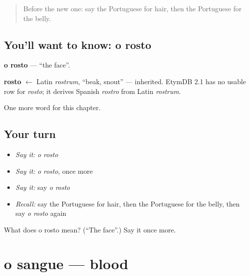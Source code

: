 \label{lesson:PT-C32-rosto}



\begin{quote}
Before the new one: say the Portuguese for hair, then the Portuguese for the belly.
\end{quote}

\subsection*{You'll want to know: o rosto}
\textbf{o rosto} — \textquotedblleft{}the face\textquotedblright{}.

\begin{cousinweb}
\textbf{rosto} $\leftarrow$ Latin \emph{rostrum}, \textquotedblleft{}beak, snout\textquotedblright{} — inherited. EtymDB 2.1 has no usable row for \emph{rosto}; it derives Spanish \emph{rostro} from Latin \emph{rostrum}.
\end{cousinweb}

\begin{grammarlens}[title={What you've built}]
One more word for this chapter.
\end{grammarlens}

\subsection*{Your turn}
\begin{itemize}
\raggedright
  \item \emph{Say it:} \emph{o rosto}
  \item \emph{Say it:} \emph{o rosto}, once more
  \item \emph{Say it:} say \emph{o rosto}
  \item \emph{Recall:} say the Portuguese for hair, then the Portuguese for the belly, then say \emph{o rosto} again
\end{itemize}

\begin{tcolorbox}[breakable,colback=teal!4,colframe=teal!35!black,title={Before you move on}]
What does o rosto mean? (\textquotedblleft{}The face\textquotedblright{}.) Say it once more.
\end{tcolorbox}
\section[o sangue]{o sangue — blood}

\label{lesson:PT-C32-sangue}



